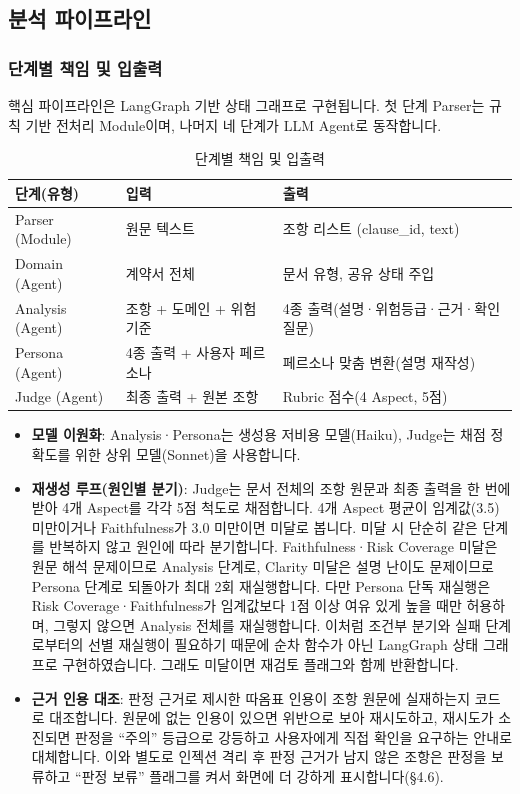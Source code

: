 \documentclass[10pt,a4paper]{article}
\newcommand{\tsz}{\fontsize{9.2}{12}\selectfont}
\begin{document}
\subsection{분석 파이프라인}
\subsubsection{단계별 책임 및 입출력}
핵심 파이프라인은 LangGraph 기반 상태 그래프로 구현됩니다. 첫 단계 Parser는 규칙 기반 전처리 Module이며, 나머지 네 단계가 LLM Agent로 동작합니다.

\begin{table}[!htbp]\centering\tsz
\caption{단계별 책임 및 입출력}\label{tab:stages}
\begin{tabularx}{0.9\textwidth}{L{3.2cm} L{4.6cm} Y}
\toprule
\textbf{단계(유형)} & \textbf{입력} & \textbf{출력}\\
\midrule
Parser (Module) & 원문 텍스트 & 조항 리스트 (clause\_id, text)\\
Domain (Agent) & 계약서 전체 & 문서 유형, 공유 상태 주입\\
Analysis (Agent) & 조항 + 도메인 + 위험 기준 & 4종 출력(설명·위험등급·근거·확인질문)\\
Persona (Agent) & 4종 출력 + 사용자 페르소나 & 페르소나 맞춤 변환(설명 재작성)\\
Judge (Agent) & 최종 출력 + 원본 조항 & Rubric 점수(4 Aspect, 5점)\\
\bottomrule
\end{tabularx}
\end{table}

\begin{itemize}
\item \textbf{모델 이원화}: Analysis·Persona는 생성용 저비용 모델(Haiku), Judge는 채점 정확도를 위한 상위 모델(Sonnet)을 사용합니다.
\item \textbf{재생성 루프(원인별 분기)}: Judge는 문서 전체의 조항 원문과 최종 출력을 한 번에 받아 4개 Aspect를 각각 5점 척도로 채점합니다. 4개 Aspect 평균이 임계값(3.5) 미만이거나 Faithfulness가 3.0 미만이면 미달로 봅니다. 미달 시 단순히 같은 단계를 반복하지 않고 원인에 따라 분기합니다. Faithfulness·Risk Coverage 미달은 원문 해석 문제이므로 Analysis 단계로, Clarity 미달은 설명 난이도 문제이므로 Persona 단계로 되돌아가 최대 2회 재실행합니다. 다만 Persona 단독 재실행은 Risk Coverage·Faithfulness가 임계값보다 1점 이상 여유 있게 높을 때만 허용하며, 그렇지 않으면 Analysis 전체를 재실행합니다. 이처럼 조건부 분기와 실패 단계로부터의 선별 재실행이 필요하기 때문에 순차 함수가 아닌 LangGraph 상태 그래프로 구현하였습니다. 그래도 미달이면 재검토 플래그와 함께 반환합니다.
\item \textbf{근거 인용 대조}: 판정 근거로 제시한 따옴표 인용이 조항 원문에 실재하는지 코드로 대조합니다. 원문에 없는 인용이 있으면 위반으로 보아 재시도하고, 재시도가 소진되면 판정을 ``주의'' 등급으로 강등하고 사용자에게 직접 확인을 요구하는 안내로 대체합니다. 이와 별도로 인젝션 격리 후 판정 근거가 남지 않은 조항은 판정을 보류하고 ``판정 보류'' 플래그를 켜서 화면에 더 강하게 표시합니다(\S4.6).
\end{itemize}
\end{document}

